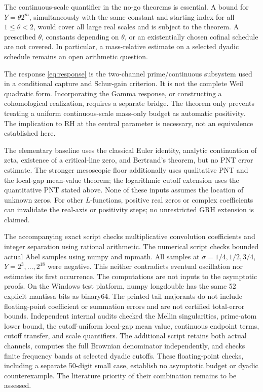 \documentclass[11pt,a4paper]{article}
\theoremstyle{definition}
\theoremstyle{remark}
\begin{document}
The continuous-scale quantifier in the no-go theorems is essential.
A bound for \(Y=\theta2^m\), simultaneously with the same constant
and starting index for all \(1\le\theta<2\), would cover all large
real scales and is subject to the theorem.
A prescribed \(\theta\), constants depending on \(\theta\), or an
existentially chosen cofinal schedule are not covered.
In particular, a mass-relative estimate on a selected dyadic
schedule remains an open arithmetic question.

The response \eqref{eq:response} is the two-channel prime/continuous
subsystem used in a conditional capture and Schur-gain criterion.
It is not the complete Weil quadratic form. Incorporating the Gamma
response, or constructing a cohomological realization, requires a
separate bridge. The theorem only prevents treating a uniform
continuous-scale mass-only budget as automatic positivity.
The implication to RH at the central parameter is necessary, not
an equivalence established here.

The elementary baseline uses the classical Euler identity, analytic
continuation of zeta, existence of a critical-line zero, and Bertrand's
theorem, but no PNT error estimate. The stronger mesoscopic floor
additionally uses qualitative PNT and the local-gap mean-value theorem;
the logarithmic cutoff extension uses the quantitative PNT stated above.
None of these inputs assumes the location of unknown zeros.
For other \(L\)-functions, positive real zeros or complex coefficients
can invalidate the real-axis or positivity steps; no unrestricted
GRH extension is claimed.

The accompanying exact script
 checks multiplicative
convolution coefficients and integer separation using rational
arithmetic. The numerical script
 checks bounded actual
Abel samples using numpy and mpmath. All samples at
\(\sigma=1/4,1/2,3/4\), \(Y=2^3,\ldots,2^{18}\) were negative.
This neither contradicts eventual oscillation nor estimates its first
occurrence. The computations are not inputs to the asymptotic proofs.
On the Windows test platform, numpy longdouble has the same
52 explicit mantissa bits as binary64. The printed tail majorants
do not include floating-point coefficient or summation errors and
are not certified total-error bounds.
Independent internal audits checked the Mellin singularities,
prime-atom lower bound, the cutoff-uniform local-gap mean value,
continuous endpoint terms, cutoff transfer, and scale quantifiers.
The additional script
 retains both actual
channels, computes the full Brownian denominator independently, and
checks finite frequency bands at selected dyadic cutoffs.
These floating-point checks, including a separate 50-digit small
case, establish no asymptotic budget or dyadic counterexample.
The literature priority of their combination remains to be assessed.
\end{document}
